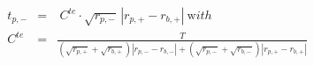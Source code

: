 


\begin{eqnarray*}
  t_{p,-} & = & \ C^{te} \cdot \sqrt{r_{p,-}}\,\left| r_{p,+} - r_{b,+} \right|
                \ {\mathrm with}
\\
   C^{te} & = & \frac{T}
                 {\left( \sqrt{r_{p,+}} + \sqrt{r_{b,+}} \right)
                  \left| r_{p,-} - r_{b,-} \right| + 
                  \left( \sqrt{r_{p,-}} + \sqrt{r_{b,-}} \right)
                  \left| r_{p,+} - r_{b,+} \right|}
\end{eqnarray*}

